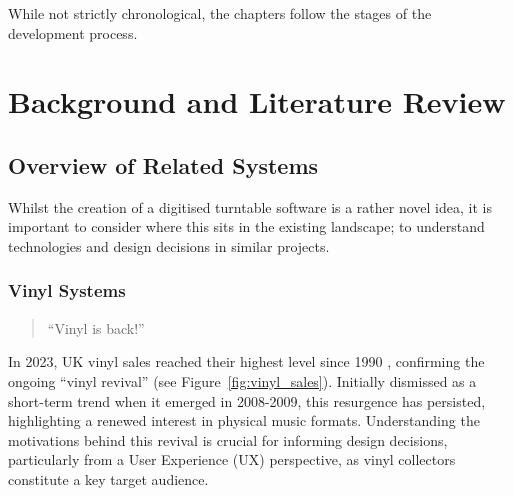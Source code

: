             While not strictly chronological, the chapters follow the stages of the development process.
    
    \section{Background and Literature Review} %
    
      \subsection{Overview of Related Systems}
    
        Whilst the creation of a digitised turntable software is a rather novel idea, it is important to consider where this sits in the existing landscape; to understand technologies and design decisions in similar projects.
      
        \subsubsection{Vinyl Systems}
    
            \begin{quote}
                ``Vinyl is back!'' \cite{bechhofervttspec}
            \end{quote}
            
            In 2023, UK vinyl sales reached their highest level since 1990 \cite{geraghty2023uk_vinyl_sales}, confirming the ongoing ``vinyl revival'' \cite{vinylRevival} (see Figure~\ref{fig:vinyl_sales}). Initially dismissed as a short-term trend when it emerged in 2008-2009, this resurgence has persisted, highlighting a renewed interest in physical music formats. Understanding the motivations behind this revival is crucial for informing design decisions, particularly from a User Experience (UX) perspective, as vinyl collectors constitute a key target audience.
            
